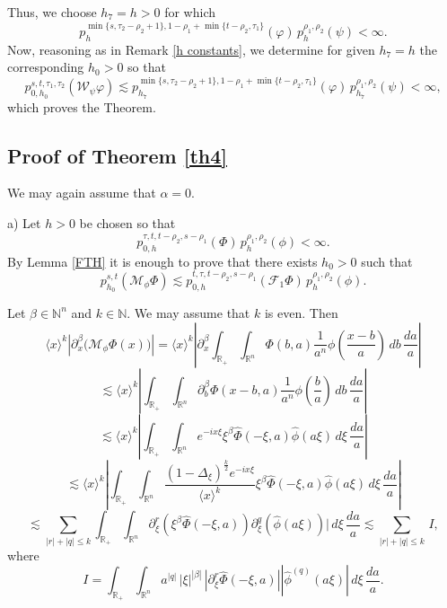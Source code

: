 \documentclass[reqno,12pt]{amsart}
\theoremstyle{plain}
\theoremstyle{definition}
\theoremstyle{remark}
\begin{document}
\par

Thus, we choose $h_7 = h >0 $ for which
$$
p^{\min\{s, \tau_2 - \rho_2 +1\}, 1- \rho_1+ \min\{t  - \rho_2, \tau_1 \}} _{h } (\varphi)
\, p^{\rho_1, \rho_2}_{h} (\psi) < \infty.
$$
Now, reasoning as in Remark \ref{h constants}, we determine for given $h_7 = h$ the corresponding
$ h_0 > 0 $  so that
$$
p^{s, t, \tau_1, \tau_2} _{0, h_0} (\mathcal{W}_\psi \varphi)\lesssim
p^{\min\{s, \tau_2 - \rho_2 +1\}, 1- \rho_1+ \min\{t  - \rho_2, \tau_1 \}} _{h_7 } (\varphi) \, p^{\rho_1,  \rho_2}_{h_7} (\psi)
< \infty,
$$
which proves the Theorem.

\par

\subsection{Proof of Theorem \ref{th4}} We may again assume that $ \alpha = 0$.

a) Let $h>0$ be chosen so that
$$
p^{\tau,t, t - \rho_2, s - \rho_1}_{0, h} (
\Phi) \, p^{\rho_1, \rho_2}_{h} (\phi) < \infty.
$$
By Lemma \ref{FTH} it is enough to prove that there exists $h_0>0$
such that
\begin{equation} \label{eq9}
p^{s,t}_{h_0} ({\mathcal M}_{\phi} \Phi) \lesssim p^{t, \tau,
t - \rho_2, s - \rho_1}_{0, h} ({\mathcal F}_1 \Phi) \,
p^{\rho_1, \rho_2}_{ h} (\phi).
\end{equation}

\par

Let $  \beta \in \mathbb{N}^n$ and $k \in \mathbb{N} $.  We may assume that $k$ is even. Then
$$
\langle x \rangle^{k} \left|\partial_x^{\beta} \big({\mathcal M}_{\phi}
\Phi (x)\big)\right| = \langle x \rangle^{k} \left|\partial_x^{\beta}
\int_{\mathbb{R}_+} \int_{\mathbb{R}^n} \Phi (b, a) \frac{1}{a^n}
\phi \left(\frac{x - b}{a}\right) \, db \, \frac{da}{a}\right|
$$
$$
\lesssim \langle x \rangle^{k} \left|\int_{\mathbb{R}_+}
\int_{\mathbb{R}^n}
\partial_b^{\beta} \Phi (x - b, a) \frac{1}{a^n} \phi \left(\frac{b}{a}\right) \, db \, \frac{da}{a}\right|
$$
$$
\lesssim \langle x \rangle^{k} \left|\int_{\mathbb{R}_+}
\int_{\mathbb{R}^n}   e^{-i x \xi} \xi^{\beta} \hat{\Phi} (-\xi, a)
\hat{\phi} (a \xi) \, d\xi \, \frac{da}{a}\right|
$$
$$
\lesssim \langle x \rangle^{k} \left|\int_{\mathbb{R}_+}
\int_{\mathbb{R}^n} \frac{(1 - \Delta_{\xi})^{\frac{k}{2}} e^{-i x
\xi}}{ \langle x \rangle^{k} } \xi^{\beta} \hat{\Phi} (-\xi, a)
\hat{\phi} (a \xi) \, d\xi \, \frac{da}{a}\right|
$$
$$
\lesssim \sum_{|r| + |q| \leq k}  \int_{\mathbb{R}_+}
\int_{\mathbb{R}^n}
\partial_{\xi}^r (\xi^{\beta} \hat{\Phi} (-\xi, a))
\partial_{\xi}^{q} (\hat{\phi} (a \xi))| \, d\xi \, \frac{da}{a}
\lesssim  \sum_{|r| + |q| \leq k} \, I,
$$
where
$$
I = \int_{\mathbb{R}_+} \int_{\mathbb{R}^n} a^{|q|} \,
|\xi|^{|\beta|} \, | \partial_{\xi}^r \hat{\Phi} (-\xi, a)| |\hat{\phi}^{(q)}
(a \xi)| \, d\xi\, \frac{da}{a}.
$$
\end{document}
